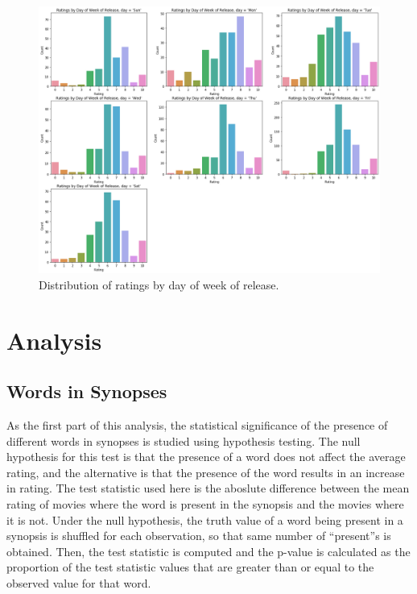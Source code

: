 \documentclass[12pt, oneside]{article}   	%
\begin{document}
\begin{itemize}
\begin{figure}[H]
\includegraphics[width=\textwidth]{ratings_dow}
\caption{\label{fig:ratings_dow}Distribution of ratings by day of week of release.}
\end{figure}

\end{itemize}

\section{Analysis}

\subsection{Words in Synopses}

As the first part of this analysis, the statistical significance of the presence of different words in synopses is studied using hypothesis testing. The null hypothesis for this test is that the presence of a word does not affect the average rating, and the alternative is that the presence of the word results in an increase in rating. The test statistic used here is the aboslute difference between the mean rating of movies where the word is present in the synopsis and the movies where it is not. Under the null hypothesis, the truth value of a word being present in a synopsis is shuffled for each observation, so that same number of ``present''s is obtained. Then, the test statistic is computed and the p-value is calculated as the proportion of the test statistic values that are greater than or equal to the observed value for that word.
\end{document}
